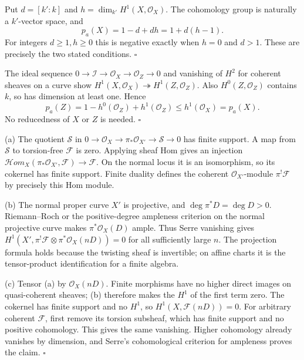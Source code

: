 \documentclass[11pt]{article}
\let\chapterexercise\exercise
\renewcommand{\exercise}[2]{\Needspace{8\baselineskip}\chapterexercise{#1}{#2}}
\begin{document}
Put $d=[k':k]$ and $h=\dim_{k'}H^1(X,\mathcal O_X)$. The cohomology group is naturally a $k'$-vector space, and
\[ p_a(X)=1-d+dh=1+d(h-1). \]
For integers $d\ge1,h\ge0$ this is negative exactly when $h=0$ and $d>1$. These are precisely the two stated conditions. \hfill$\square$

\pf
The ideal sequence $0\to\mathcal I\to\mathcal O_X\to\mathcal O_Z\to0$ and vanishing of $H^2$ for coherent sheaves on a curve show $H^1(X,\mathcal O_X)\twoheadrightarrow H^1(Z,\mathcal O_Z)$. Also $H^0(Z,\mathcal O_Z)$ contains $k$, so has dimension at least one. Hence
\[ p_a(Z)=1-h^0(\mathcal O_Z)+h^1(\mathcal O_Z)\le h^1(\mathcal O_X)=p_a(X). \]
No reducedness of $X$ or $Z$ is needed. \hfill$\square$

\pf
(a) The quotient $\mathcal S$ in $0\to\mathcal O_X\to\pi_*\mathcal O_{X'}\to\mathcal S\to0$ has finite support. A map from $\mathcal S$ to torsion-free $\mathcal F$ is zero. Applying sheaf Hom gives an injection $\mathcal H om_X(\pi_*\mathcal O_{X'},\mathcal F)\to\mathcal F$. On the normal locus it is an isomorphism, so its cokernel has finite support. Finite duality defines the coherent $\mathcal O_{X'}$-module $\pi^!\mathcal F$ by precisely this Hom module.

(b) The normal proper curve $X'$ is projective, and $\deg\pi^*D=\deg D>0$. Riemann--Roch or the positive-degree ampleness criterion on the normal projective curve makes $\pi^*\mathcal O_X(D)$ ample. Thus Serre vanishing gives $H^1(X',\pi^!\mathcal F\otimes\pi^*\mathcal O_X(nD))=0$ for all sufficiently large $n$. The projection formula holds because the twisting sheaf is invertible; on affine charts it is the tensor-product identification for a finite algebra.

(c) Tensor (a) by $\mathcal O_X(nD)$. Finite morphisms have no higher direct images on quasi-coherent sheaves; (b) therefore makes the $H^1$ of the first term zero. The cokernel has finite support and no $H^1$, so $H^1(X,\mathcal F(nD))=0$. For arbitrary coherent $\mathcal F$, first remove its torsion subsheaf, which has finite support and no positive cohomology. This gives the same vanishing. Higher cohomology already vanishes by dimension, and Serre's cohomological criterion for ampleness proves the claim. \hfill$\square$
\end{document}

